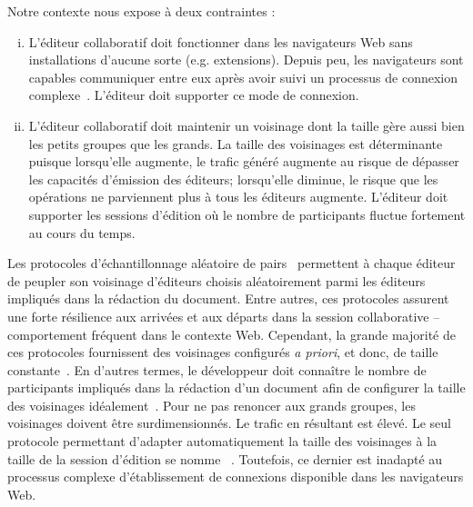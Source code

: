 \noindent Notre contexte nous expose à deux contraintes :

\begin{enumerate}[(i)]
\item L'éditeur collaboratif doit fonctionner dans les navigateurs Web sans
  installations d'aucune sorte (e.g. extensions). Depuis peu, les navigateurs
  sont capables communiquer entre eux après avoir suivi un processus de
  connexion complexe~\cite{webrtc}. L'éditeur doit supporter ce mode de
  connexion.

\item L'éditeur collaboratif doit maintenir un voisinage dont la taille gère
  aussi bien les petits groupes que les grands.  La taille des voisinages est
  déterminante puisque lorsqu'elle augmente, le trafic généré augmente au risque
  de dépasser les capacités d'émission des éditeurs; lorsqu'elle diminue,
  le risque que les opérations ne parviennent plus à tous les éditeurs augmente.
  L'éditeur doit supporter les sessions d'édition où le nombre de participants
  fluctue fortement au cours du temps.
\end{enumerate}

Les protocoles d'échantillonnage aléatoire de pairs~\cite{jelasity2007gossip}
permettent à chaque éditeur de peupler son voisinage d'éditeurs choisis
aléatoirement parmi les éditeurs impliqués dans la rédaction du document. Entre
autres, ces protocoles assurent une forte résilience aux arrivées et aux départs
dans la session collaborative -- comportement fréquent dans le contexte
Web. Cependant, la grande majorité de ces protocoles fournissent des voisinages
configurés \emph{a priori}, et donc, de taille
constante~\cite{eugster2003lightweight, jelasity2007gossip,
  leitao2007dependable, tolgyeski2009adaptive, voulgaris2005cyclon}. En d'autres
termes, le développeur doit connaître le nombre de participants impliqués dans
la rédaction d'un document afin de configurer la taille des voisinages
idéalement~\cite{erdos1959random}.  Pour ne pas renoncer aux grands groupes, les
voisinages doivent être surdimensionnés. Le trafic en résultant est élevé. Le
seul protocole permettant d'adapter automatiquement la taille des voisinages à
la taille de la session d'édition se nomme
\SCAMP~\cite{ganesh2003peer}. Toutefois, ce dernier est inadapté au processus
complexe d'établissement de connexions disponible dans les navigateurs Web.

